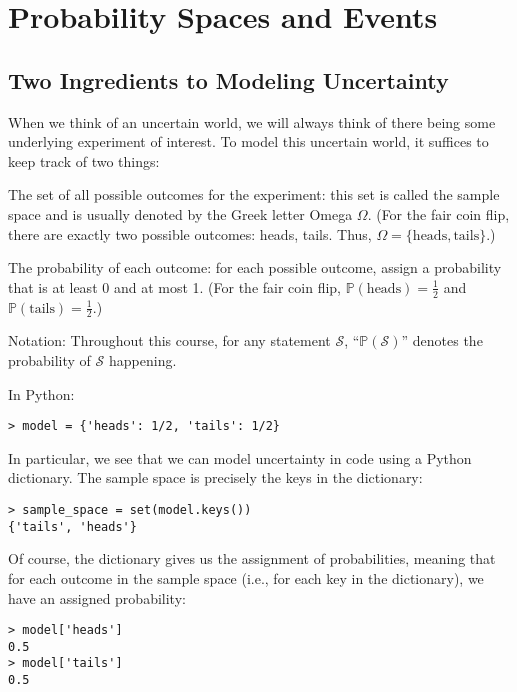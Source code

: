 \documentclass[6008notes.tex]{subfiles}
\begin{document}
\graphicspath{ {images/probspace/} }

\section{Probability Spaces and Events}

\subsection{Two Ingredients to Modeling Uncertainty}

When we think of an uncertain world, we will always think of there being some underlying experiment of interest. To model this uncertain world, it suffices to keep track of two things:

The set of all possible outcomes for the experiment: this set is called the sample space and is usually denoted by the Greek letter Omega $\Omega$.
(For the fair coin flip, there are exactly two possible outcomes: heads, tails. Thus, $\Omega =\{ \text {heads},\text {tails}\}$.)

The probability of each outcome: for each possible outcome, assign a probability that is at least 0 and at most 1.
(For the fair coin flip, $\mathbb {P}(\text {heads})=\frac{1}{2}$ and $\mathbb {P}(\text {tails})=\frac{1}{2}$.)

Notation: Throughout this course, for any statement $\mathcal{S}$, ``$\mathbb {P}(\mathcal{S})$'' denotes the probability of $\mathcal{S}$ happening.

In Python:

\begin{lstlisting}
> model = {'heads': 1/2, 'tails': 1/2}
\end{lstlisting}
In particular, we see that we can model uncertainty in code using a Python dictionary. The sample space is precisely the keys in the dictionary:

\begin{lstlisting}
> sample_space = set(model.keys())
{'tails', 'heads'}
\end{lstlisting}
Of course, the dictionary gives us the assignment of probabilities, meaning that for each outcome in the sample space (i.e., for each key in the dictionary), we have an assigned probability:

\begin{lstlisting}
> model['heads']
0.5
> model['tails']
0.5
\end{lstlisting}
\end{document}
